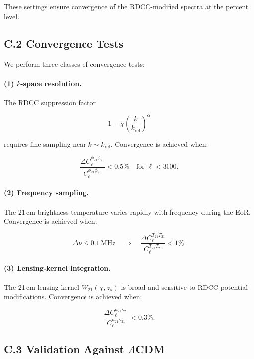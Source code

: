 \documentclass[11pt,a4paper]{article}
\begin{document}
These settings ensure convergence of the RDCC-modified spectra at the percent level.

\subsection*{C.2 Convergence Tests}

We perform three classes of convergence tests:

\paragraph{(1) $k$-space resolution.}
The RDCC suppression factor


\[
1 - \chi\left(\frac{k}{k_{\mathrm{rel}}}\right)^{\alpha}
\]


requires fine sampling near $k \sim k_{\mathrm{rel}}$.
Convergence is achieved when:


\[
\frac{\Delta C_{\ell}^{\phi_{21}\phi_{21}}}{C_{\ell}^{\phi_{21}\phi_{21}}} < 0.5\%
\quad \text{for } \ell < 3000.
\]



\paragraph{(2) Frequency sampling.}
The 21\,cm brightness temperature varies rapidly with frequency during the EoR.
Convergence is achieved when:


\[
\Delta \nu \leq 0.1\,\mathrm{MHz}
\quad \Rightarrow \quad
\frac{\Delta C_{\ell}^{T_{21}T_{21}}}{C_{\ell}^{T_{21}T_{21}}} < 1\%.
\]



\paragraph{(3) Lensing-kernel integration.}
The 21\,cm lensing kernel $W_{21}(\chi,z_{s})$ is broad and sensitive to RDCC potential
modifications.
Convergence is achieved when:


\[
\frac{\Delta C_{\ell}^{\kappa_{21}\kappa_{21}}}{C_{\ell}^{\kappa_{21}\kappa_{21}}} < 0.3\%.
\]



\subsection*{C.3 Validation Against $\Lambda$CDM}
\end{document}

